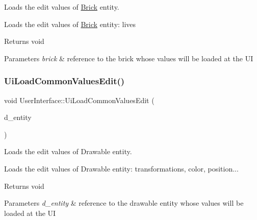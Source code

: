 Loads the edit values of \hyperlink{class_brick}{Brick} entity. 

Loads the edit values of \hyperlink{class_brick}{Brick} entity\+: lives

\begin{DoxyReturn}{Returns}
void 
\end{DoxyReturn}

\begin{DoxyParams}{Parameters}
{\em brick} & reference to the brick whose values will be loaded at the UI \\
\hline
\end{DoxyParams}
\mbox{\label{class_user_interface_abd2782013953f24723f787302f32e134}} 
\subsubsection{\texorpdfstring{Ui\+Load\+Common\+Values\+Edit()}{UiLoadCommonValuesEdit()}}
{\footnotesize\ttfamily void User\+Interface\+::\+Ui\+Load\+Common\+Values\+Edit (\begin{DoxyParamCaption}\item[{\hyperlink{class_drawable_entity}{Drawable\+Entity} \&}]{d\+\_\+entity }\end{DoxyParamCaption})}



Loads the edit values of Drawable entity. 

Loads the edit values of Drawable entity\+: transformations, color, position...

\begin{DoxyReturn}{Returns}
void 
\end{DoxyReturn}

\begin{DoxyParams}{Parameters}
{\em d\+\_\+entity} & reference to the drawable entity whose values will be loaded at the UI \\
\hline
\end{DoxyParams}
\mbox{\label{class_user_interface_a586a26b3ec692b0374d3b5042e685a4a}} 
